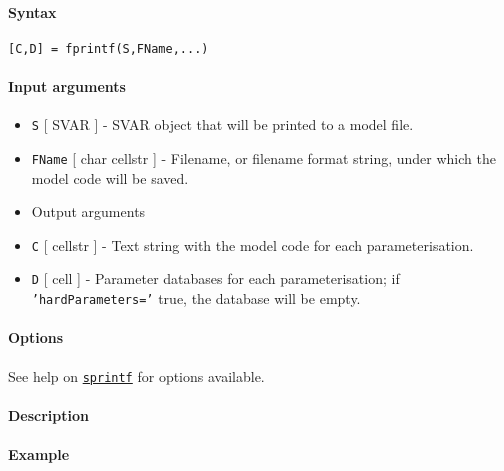 


	\paragraph{Syntax}\label{syntax}

\begin{verbatim}
[C,D] = fprintf(S,FName,...)
\end{verbatim}

\paragraph{Input arguments}\label{input-arguments}

\begin{itemize}
\item
  \texttt{S} {[} SVAR {]} - SVAR object that will be printed to a model
  file.
\item
  \texttt{FName} {[} char \textbar{} cellstr {]} - Filename, or filename
  format string, under which the model code will be saved.
\item
  Output arguments
\item
  \texttt{C} {[} cellstr {]} - Text string with the model code for each
  parameterisation.
\item
  \texttt{D} {[} cell {]} - Parameter databases for each
  parameterisation; if \texttt{'hardParameters='} true, the database
  will be empty.
\end{itemize}

\paragraph{Options}\label{options}

See help on \href{SVAR/sprintf}{\texttt{sprintf}} for options available.

\paragraph{Description}\label{description}

\paragraph{Example}\label{example}


